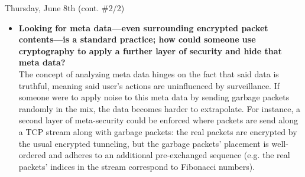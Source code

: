 \documentclass[11pt]{article}
\begin{document}
\begin{orangebox}{Thursday, June 8th \hspace{0.2cm}(cont. \#2/2)\vspace{-2.2em}\begin{flushright}\end{flushright}}
\begin{itemize}
        \item\textbf{Looking for meta data---even surrounding encrypted packet contents---is a standard practice; how could someone use cryptography to apply a further layer of security and hide that meta data?} \\
        \phantom{~~~~} The concept of analyzing meta data hinges on the fact that said data is truthful, meaning said user's actions are uninfluenced by surveillance. If someone were to apply noise to this meta data by sending garbage packets randomly in the mix, the data becomes harder to extrapolate. For instance, a second layer of meta-security could be enforced where packets are send along a TCP stream along with garbage packets: the real packets are encrypted by the usual encrypted tunneling, but the garbage packets' placement is well-ordered and adheres to an additional pre-exchanged sequence (e.g. the real packets' indices in the stream correspond to Fibonacci numbers).
    \end{itemize}
\end{orangebox}

\begin{center}
    \vspace{-0.25em}
    \hspace{0.2cm}
    \vspace{-0.4em}
\end{center}
\end{document}
